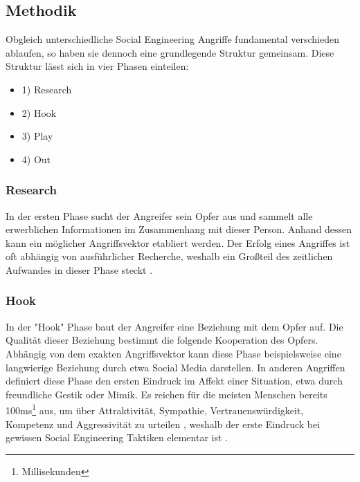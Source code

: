 \subsection{Methodik}

Obgleich unterschiedliche Social Engineering Angriffe fundamental verschieden ablaufen,
so haben sie dennoch eine grundlegende Struktur gemeinsam.
Diese Struktur lässt sich in vier Phasen einteilen:

\begin{minipage}{.5\linewidth}
    \begin{itemize}
        \setlength\itemsep{1em}
        \item 1) Research
        \item 2) Hook
        \item 3) Play
        \item 4) Out
    \end{itemize}
\end{minipage}
\hfill
\begin{minipage}{.5\linewidth}
    \centering
\end{minipage}

\subsubsection{Research}
In der ersten Phase sucht der Angreifer sein Opfer aus und sammelt alle erwerblichen Informationen
im Zusammenhang mit dieser Person. Anhand dessen kann ein möglicher Angriffsvektor etabliert werden.
Der Erfolg eines Angriffes ist oft abhängig von ausführlicher Recherche, weshalb ein Großteil des zeitlichen
Aufwandes in dieser Phase steckt .

\subsubsection{Hook}
In der "Hook" Phase baut der Angreifer eine Beziehung mit dem Opfer auf. Die Qualität dieser Beziehung bestimmt
die folgende Kooperation des Opfers. Abhängig von dem exakten Angriffsvektor kann diese Phase beispielsweise
eine langwierige Beziehung durch etwa Social Media darstellen. In anderen Angriffen definiert diese Phase den ersten
Eindruck im Affekt einer Situation, etwa durch freundliche Gestik oder Mimik. Es reichen für die meisten Menschen
bereits 100ms\footnote{Millisekunden} aus, um über Attraktivität, Sympathie, Vertrauenswürdigkeit, Kompetenz und
Aggressivität zu urteilen , weshalb der erste Eindruck bei gewissen Social Engineering
Taktiken elementar ist .

